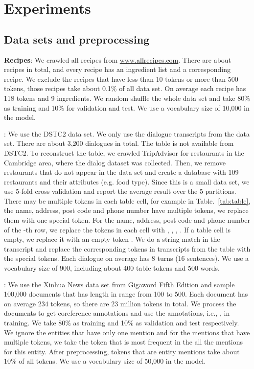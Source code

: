\documentclass[11pt,letterpaper]{article}
\begin{document}
\section{Experiments}
\subsection{Data sets and preprocessing}
{\bf Recipes}: We crawled all recipes from
\url{www.allrecipes.com}. There are about  recipes in total, and every
recipe has an ingredient list and a corresponding recipe. We exclude the
recipes that have less than 10 tokens or more than 500 tokens, those recipes
take about 0.1\% of all data set.  On average each recipe has 118 tokens and 9
ingredients.  We random shuffle the whole data set and take 80\% as training
and 10\% for validation and test. We use a vocabulary size of 10,000 in the
model.

: We use the DSTC2 data
set. We only use the dialogue transcripts from the data set. There are about
3,200 dialogues in total. The table is not available from DSTC2.  To
reconstruct the table, we crawled TripAdvisor for restaurants in the Cambridge
area, where the dialog dataset was collected. Then, we remove restaurants that
do not appear in the data set and create a database with 109 restaurants and
their attributes (e.g. food type).  Since this is a small data set, we use
5-fold cross validation and report the average result over the 5
partitions. There may be multiple tokens in each table cell, for example in
Table.~\ref{tab:table}, the name, address, post code and phone number have
multiple tokens, we replace them with one special token. For the name, address,
post code and phone number of the -th row, we replace the tokens in each
cell with , , ,
. If a table cell is empty, we replace it with an empty
token . We do a string match in the transcript and replace the
corresponding tokens in transcripts from the table with the special
tokens. Each dialogue on average has 8 turns (16 sentences). We use a
vocabulary size of 900, including about 400 table tokens and 500 words.

: We use the Xinhua News data set from Gigaword Fifth
Edition and sample 100,000 documents that has length in range from 100 to
500. Each document has on average 234 tokens, so there are 23 million tokens in
total. We process the documents to get coreference annotations
and use the annotations, i.e., , in training. We take 80\% as
training and 10\% as validation and test respectively. We ignore the entities
that have only one mention and for the mentions that have multiple tokens, we
take the token that is most frequent in the all the mentions for this
entity. After preprocessing, tokens that are entity mentions take about 10\% of
all tokens. We use a vocabulary size of 50,000 in the model.
\end{document}
